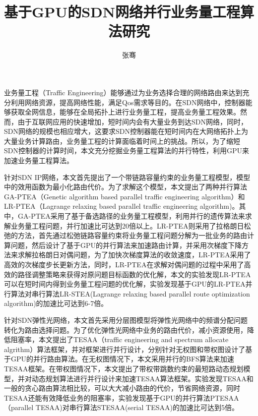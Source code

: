 \documentclass[master]{thesis-uestc}
\title{基于GPU的SDN网络并行业务量工程算法研究}
\author{张骞}
\begin{document}
\begin{chineseabstract}
业务量工程（Traffic Engineering）能够通过为业务选择合理的网络路由来达到充分利用网络资源，提高网络性能，满足Qos需求等目的。在SDN网络中，控制器能够获取全网信息，能够在全局拓扑上进行业务量工程，提高业务量工程效果。然而，由于互联网应用的快速增加，短时间内会有大量业务到达SDN网络，同时，SDN网络的规模也相应增大，这要求SDN控制器能在短时间内在大网络拓扑上为大量业务计算路由，业务量工程的计算面临着时间上的挑战。所以，为了缩短SDN控制器的计算时间，本文充分挖掘业务量工程算法的并行特性，利用GPU来加速业务量工程算法。

针对SDN IP网络，本文首先提出了一个带链路容量约束的业务量工程模型，模型中的效用函数为最小化路由代价。为了求解这个模型，本文提出了两种并行算法GA-PTEA（Genetic algorithm based parallel traffic engineering algorithm）和LR-PTEA（Lagrange relaxing based parallel traffic engineering algorithm)。其中，GA-PTEA采用了基于备选路径的业务量工程模型，利用并行的遗传算法来求解业务量工程问题，并行加速比可达到20倍以上。LR-PTEA则采用了拉格朗日松弛的方法，首先通过松弛链路容量约束将业务量工程问题分解为一批业务的路由计算问题，然后设计了基于GPU的并行算法来加速路由计算，并采用次梯度下降方法来求解拉格朗日对偶问题，为了加快次梯度算法的收敛速度，LR-PTEA采用了高效的次梯度步长更新方法，同时，LR-PTEA在求解对偶问题的过程中采用了高效的路径调整策略来获得对原问题目标函数的优化解，本文的实验发现LR-PTEA可以在短时间内得到业务量工程问题的优化解，实验发现基于GPU的LR-PTEA并行算法对串行算法LR-STEA(Lagrange relaxing based parallel route optimization algorithm)的加速比可达到6-7倍。

针对SDN弹性光网络，本文首先采用分层图模型将弹性光网络中的频谱分配问题转化为路由选择问题。为了优化弹性光网络中业务的路由代价，减小资源使用，降低阻塞率，本文提出了TESAA（traffic engineering and spectrum allocate algrithm）算法框架，并对框架进行并行设计，分别针对无权图和带权图设计了基于GPU的并行路由算法。在无权图情况下，本文采用并行的BFS算法来加速TESAA框架。在带权图情况下，本文提出了带权带跳数约束的最短路动态规划模型，并对动态规划算法进行并行设计来加速TESAA算法框架。实验发现TESAA和一般的贪心路由算法相比较，可以大大减小路由的代价，节省网络资源，同时TESAA还能有效降低业务的阻塞率，实验发现基于GPU的并行算法PTESAA（parallel TESAA)对串行算法STESAA(serial TESAA)的加速比可达到5倍。

\end{chineseabstract}
\end{document}
